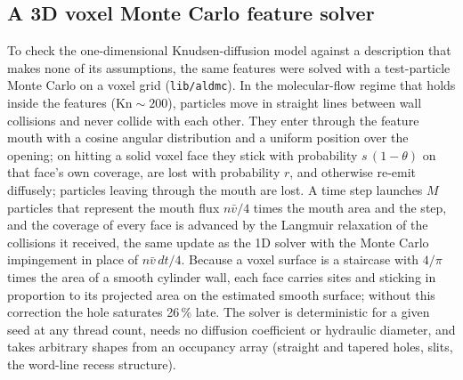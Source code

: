\documentclass[11pt,letterpaper]{article}
\begin{document}
\subsection{A 3D voxel Monte Carlo feature solver}
\label{sec:voxel}
To check the one-dimensional Knudsen-diffusion model against a description that makes none of its assumptions, the same features were solved with a test-particle Monte Carlo on a voxel grid (\texttt{lib/aldmc}). In the molecular-flow regime that holds inside the features ($\mathrm{Kn} \sim 200$), particles move in straight lines between wall collisions and never collide with each other. They enter through the feature mouth with a cosine angular distribution and a uniform position over the opening; on hitting a solid voxel face they stick with probability $s\,(1 - \theta)$ on that face's own coverage, are lost with probability $r$, and otherwise re-emit diffusely; particles leaving through the mouth are lost. A time step launches $M$ particles that represent the mouth flux $n\bar{v}/4$ times the mouth area and the step, and the coverage of every face is advanced by the Langmuir relaxation of the collisions it received, the same update as the 1D solver with the Monte Carlo impingement in place of $n\bar{v}\,dt/4$. Because a voxel surface is a staircase with $4/\pi$ times the area of a smooth cylinder wall, each face carries sites and sticking in proportion to its projected area on the estimated smooth surface; without this correction the hole saturates 26\,\% late. The solver is deterministic for a given seed at any thread count, needs no diffusion coefficient or hydraulic diameter, and takes arbitrary shapes from an occupancy array (straight and tapered holes, slits, the word-line recess structure).
\end{document}
